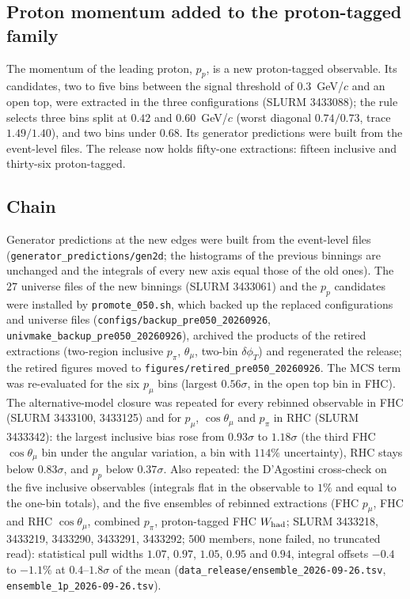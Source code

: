 \subsection{Proton momentum added to the proton-tagged family}
The momentum of the leading proton, $p_p$, is a new proton-tagged observable. Its candidates, two to
five bins between the signal threshold of $0.3$~GeV/$c$ and an open top, were extracted in the three
configurations (SLURM 3433088); the rule selects three bins split at $0.42$ and $0.60$~GeV/$c$ (worst
diagonal $0.74/0.73$, trace $1.49/1.40$), and two bins under $0.68$. Its generator predictions were
built from the event-level files. The release now holds fifty-one extractions: fifteen inclusive and
thirty-six proton-tagged.

\subsection{Chain}
{\sloppy Generator predictions at the new edges were built from the event-level files
(\texttt{generator\_predictions/gen2d}; the histograms of the previous binnings are unchanged and the
integrals of every new axis equal those of the old ones). The $27$ universe files of the new
binnings (SLURM 3433061) and the $p_p$ candidates were installed by \texttt{promote\_050.sh}, which
backed up the replaced configurations and universe files
(\texttt{configs/backup\_pre050\_20260926}, \texttt{univmake\_backup\_pre050\_20260926}), archived the
products of the retired extractions (two-region inclusive $p_\pi$, $\theta_\mu$, two-bin
$\delta\phi_T$) and regenerated the release; the retired figures moved to
\texttt{figures/retired\_pre050\_20260926}. The MCS term was re-evaluated for the six $p_\mu$ bins
(largest $0.56\sigma$, in the open top bin in FHC). The alternative-model closure was repeated for
every rebinned observable in FHC (SLURM 3433100, 3433125) and for $p_\mu$, $\cos\theta_\mu$ and
$p_\pi$ in RHC (SLURM 3433342): the largest inclusive bias rose from $0.93\sigma$ to $1.18\sigma$
(the third FHC $\cos\theta_\mu$ bin under the angular variation, a bin with $114\%$ uncertainty),
RHC stays below $0.83\sigma$, and $p_p$ below $0.37\sigma$. Also repeated: the D'Agostini cross-check on the five inclusive observables
(integrals flat in the observable to $1\%$ and equal to the one-bin totals), and the five ensembles
of rebinned extractions (FHC $p_\mu$, FHC and RHC $\cos\theta_\mu$, combined $p_\pi$, proton-tagged
FHC $W_{\rm had}$; SLURM 3433218, 3433219, 3433290, 3433291, 3433292; $500$ members, none failed,
no truncated read): statistical pull widths $1.07$, $0.97$, $1.05$, $0.95$ and $0.94$, integral
offsets $-0.4$ to $-1.1\%$ at $0.4$--$1.8\sigma$ of the mean
(\texttt{data\_release/ensemble\_2026-09-26.tsv}, \texttt{ensemble\_1p\_2026-09-26.tsv}).\par}

